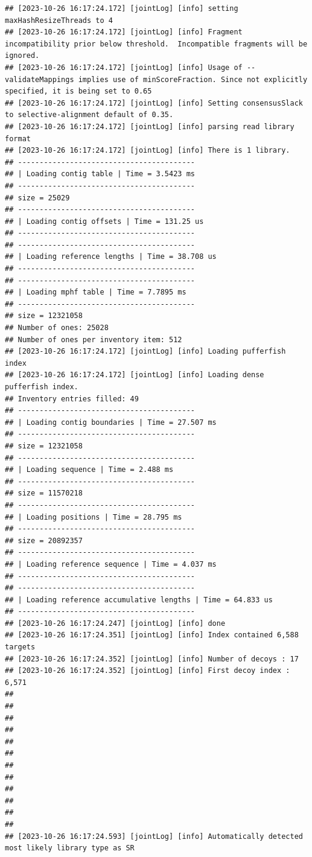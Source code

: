 \documentclass[
]{book}
\begin{document}
\begin{verbatim}
## [2023-10-26 16:17:24.172] [jointLog] [info] setting maxHashResizeThreads to 4
## [2023-10-26 16:17:24.172] [jointLog] [info] Fragment incompatibility prior below threshold.  Incompatible fragments will be ignored.
## [2023-10-26 16:17:24.172] [jointLog] [info] Usage of --validateMappings implies use of minScoreFraction. Since not explicitly specified, it is being set to 0.65
## [2023-10-26 16:17:24.172] [jointLog] [info] Setting consensusSlack to selective-alignment default of 0.35.
## [2023-10-26 16:17:24.172] [jointLog] [info] parsing read library format
## [2023-10-26 16:17:24.172] [jointLog] [info] There is 1 library.
## -----------------------------------------
## | Loading contig table | Time = 3.5423 ms
## -----------------------------------------
## size = 25029
## -----------------------------------------
## | Loading contig offsets | Time = 131.25 us
## -----------------------------------------
## -----------------------------------------
## | Loading reference lengths | Time = 38.708 us
## -----------------------------------------
## -----------------------------------------
## | Loading mphf table | Time = 7.7895 ms
## -----------------------------------------
## size = 12321058
## Number of ones: 25028
## Number of ones per inventory item: 512
## [2023-10-26 16:17:24.172] [jointLog] [info] Loading pufferfish index
## [2023-10-26 16:17:24.172] [jointLog] [info] Loading dense pufferfish index.
## Inventory entries filled: 49
## -----------------------------------------
## | Loading contig boundaries | Time = 27.507 ms
## -----------------------------------------
## size = 12321058
## -----------------------------------------
## | Loading sequence | Time = 2.488 ms
## -----------------------------------------
## size = 11570218
## -----------------------------------------
## | Loading positions | Time = 28.795 ms
## -----------------------------------------
## size = 20892357
## -----------------------------------------
## | Loading reference sequence | Time = 4.037 ms
## -----------------------------------------
## -----------------------------------------
## | Loading reference accumulative lengths | Time = 64.833 us
## -----------------------------------------
## [2023-10-26 16:17:24.247] [jointLog] [info] done
## [2023-10-26 16:17:24.351] [jointLog] [info] Index contained 6,588 targets
## [2023-10-26 16:17:24.352] [jointLog] [info] Number of decoys : 17
## [2023-10-26 16:17:24.352] [jointLog] [info] First decoy index : 6,571 
## 
## 
## 
## 
## 
## 
## 
## 
## 
## 
## 
## 
## [2023-10-26 16:17:24.593] [jointLog] [info] Automatically detected most likely library type as SR

\end{verbatim}
\end{document}
